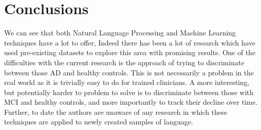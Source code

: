 \section{Conclusions}\label{conclusions}
We can see that both Natural Language Processing and Machine Learning techniques have a lot to offer, Indeed there has been a lot of research which have used pre-existing datasets to explore this area with promising results. One of the difficulties with the current research is the approach of trying to discriminate between those AD and healthy controls. This is not necessarily a problem in the real world as it is trivially easy to do for trained clinicians. A more interesting, but potentially harder to problem to solve is to discriminate between those with MCI and healthy controls, and more importantly to track their decline over time. Further, to date the authors are unaware of any research in which these techniques are applied to newly created samples of language. 

